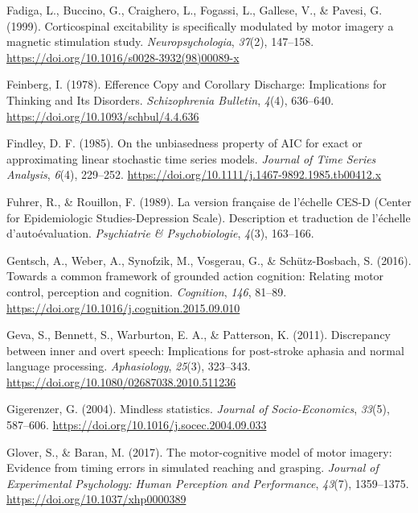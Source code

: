 \documentclass[a4paper,12pt,twoside,openright,oldfontcommands]{memoir}
\begin{document}
\hypertarget{ref-fadiga_corticospinal_1999}{}
Fadiga, L., Buccino, G., Craighero, L., Fogassi, L., Gallese, V., \&
Pavesi, G. (1999). Corticospinal excitability is specifically modulated
by motor imagery a magnetic stimulation study. \emph{Neuropsychologia},
\emph{37}(2), 147--158.
\url{https://doi.org/10.1016/s0028-3932(98)00089-x}

\hypertarget{ref-feinberg_efference_1978}{}
Feinberg, I. (1978). Efference Copy and Corollary Discharge:
Implications for Thinking and Its Disorders. \emph{Schizophrenia
Bulletin}, \emph{4}(4), 636--640.
\url{https://doi.org/10.1093/schbul/4.4.636}

\hypertarget{ref-findley_unbiasedness_1985}{}
Findley, D. F. (1985). On the unbiasedness property of AIC for exact or
approximating linear stochastic time series models. \emph{Journal of
Time Series Analysis}, \emph{6}(4), 229--252.
\url{https://doi.org/10.1111/j.1467-9892.1985.tb00412.x}

\hypertarget{ref-fuhrer_version_1989}{}
Fuhrer, R., \& Rouillon, F. (1989). La version française de l'échelle
CES-D (Center for Epidemiologic Studies-Depression Scale). Description
et traduction de l'échelle d'autoévaluation. \emph{Psychiatrie \&
Psychobiologie}, \emph{4}(3), 163--166.

\hypertarget{ref-gentsch_towards_2016}{}
Gentsch, A., Weber, A., Synofzik, M., Vosgerau, G., \& Schütz-Bosbach,
S. (2016). Towards a common framework of grounded action cognition:
Relating motor control, perception and cognition. \emph{Cognition},
\emph{146}, 81--89.
\url{https://doi.org/10.1016/j.cognition.2015.09.010}

\hypertarget{ref-geva_discrepancy_2011}{}
Geva, S., Bennett, S., Warburton, E. A., \& Patterson, K. (2011).
Discrepancy between inner and overt speech: Implications for post-stroke
aphasia and normal language processing. \emph{Aphasiology},
\emph{25}(3), 323--343.
\url{https://doi.org/10.1080/02687038.2010.511236}

\hypertarget{ref-Gigerenzer2004}{}
Gigerenzer, G. (2004). Mindless statistics. \emph{Journal of
Socio-Economics}, \emph{33}(5), 587--606.
\url{https://doi.org/10.1016/j.socec.2004.09.033}

\hypertarget{ref-glover_motor-cognitive_2017}{}
Glover, S., \& Baran, M. (2017). The motor-cognitive model of motor
imagery: Evidence from timing errors in simulated reaching and grasping.
\emph{Journal of Experimental Psychology: Human Perception and
Performance}, \emph{43}(7), 1359--1375.
\url{https://doi.org/10.1037/xhp0000389}
\end{document}
